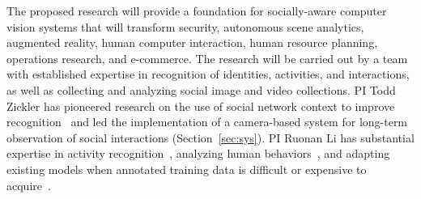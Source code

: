 The proposed research will provide a foundation for socially-aware computer vision systems that will transform security, autonomous scene analytics, augmented reality, human computer interaction, human resource planning, operations research, and e-commerce. The research will be carried out by a team with established expertise in recognition of identities, activities, and interactions, as well as collecting and analyzing social image and video collections. PI Todd Zickler has pioneered research on the use of social network context to improve recognition~\cite{Stone2008,Stone2010} and led the implementation of a camera-based system for long-term observation of social interactions (Section~\ref{sec:sys}). PI Ruonan Li has substantial expertise in activity recognition~\cite{LiIJCV2012}, analyzing human behaviors~\cite{Li2010,LiPAMI2012}, and adapting existing models when annotated training data is difficult or expensive to acquire~\cite{LiZickler2012,Li2011}. 





